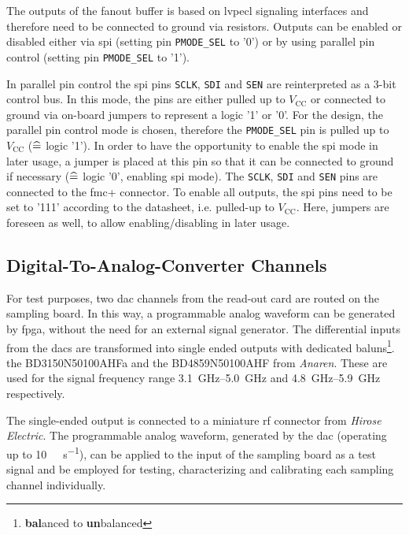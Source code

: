 The outputs of the fanout buffer is based on \gls{lvpecl} signaling interfaces and therefore need to be connected to ground via resistors.
Outputs can be enabled or disabled either via \gls{spi} (setting pin \texttt{PMODE\_SEL} to '0') or by using parallel pin control (setting pin \texttt{PMODE\_SEL} to '1'). 

In parallel pin control the \gls{spi} pins \texttt{SCLK}, \texttt{SDI} and \texttt{SEN} are reinterpreted as a 3-bit control bus.
In this mode, the pins are either pulled up to $V_\text{CC}$ or connected to ground via on-board jumpers to represent a logic '1' or '0'.
For the design, the parallel pin control mode is chosen, therefore the \texttt{PMODE\_SEL} pin is pulled up to $V_\text{CC}$ ($\mathrel{\widehat{=}}$ logic '1').
In order to have the opportunity to enable the \gls{spi} mode in later usage, a jumper is placed at this pin so that it can be connected to ground if necessary ($\mathrel{\widehat{=}}$ logic '0', enabling \gls{spi} mode).
The \texttt{SCLK}, \texttt{SDI} and \texttt{SEN} pins are connected to the \gls{fmc}+ connector.
To enable all outputs, the \gls{spi} pins need to be set to '111' according to the datasheet, i.e. pulled-up to $V_\text{CC}$. 
Here, jumpers are foreseen as well, to allow enabling/disabling in later usage.

\subsection{Digital-To-Analog-Converter Channels}
For test purposes, two \gls{dac} channels from the read-out card are routed on the sampling board.
In this way, a programmable analog waveform can be generated by \gls{fpga}, without the need for an external signal generator. 
The differential inputs from the \glspl{dac} are transformed into single ended outputs with dedicated baluns\footnote{\textbf{bal}anced to \textbf{un}balanced}. the BD3150N50100AHFa and the BD4859N50100AHF from \textit{Anaren}. 
These are used for the signal frequency range \SIrange{3.1}{5.0}{\GHz} and \SIrange{4.8}{5.9}{\GHz} respectively.

The single-ended output is connected to a miniature \gls{rf} connector from \textit{Hirose Electric}.
The programmable analog waveform, generated by the \gls{dac} (operating up to \SI{10}{\giga \sample \per \second}), can be applied to the input of the sampling board as a test signal and be employed for testing, characterizing and calibrating each sampling channel individually.

